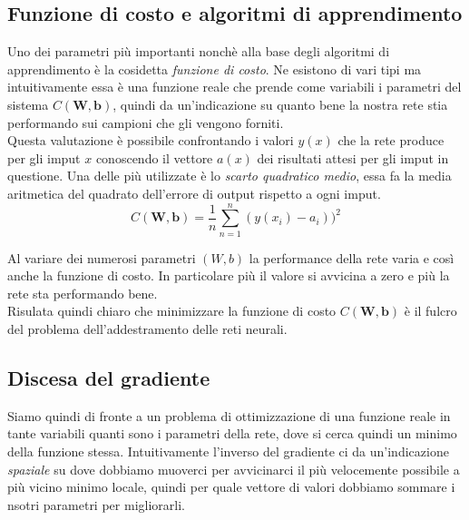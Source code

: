 \documentclass[12pt,a4paper,openright,twoside]{report}
\begin{document}
\newpage
\subsection{Funzione di costo e algoritmi di apprendimento}
Uno dei parametri più importanti nonchè alla base degli algoritmi di apprendimento è la cosidetta \emph{funzione di costo}.
Ne esistono di vari tipi ma intuitivamente essa è una funzione reale che prende come variabili i parametri del sistema $C(\mathbf{W,b})$, quindi da un'indicazione su quanto bene la nostra rete stia performando sui campioni che gli vengono forniti.\\
Questa valutazione è possibile confrontando i valori $y(x)$ che la rete produce per gli imput $x$ conoscendo il vettore $a(x)$ dei risultati attesi per gli imput in questione.
Una delle più utilizzate è lo \emph{scarto quadratico medio}, essa fa la media aritmetica del quadrato dell'errore di output rispetto a ogni imput.
\begin{equation}
    C(\mathbf{W,b}) = \frac{1}{n} \sum_{n=1}^{n} (y(x_{i}) - a_{i}))^2
\end{equation}

Al variare dei numerosi parametri $(W,b)$ la performance della rete varia e così anche la funzione di costo. In particolare più il valore si avvicina a zero e più la rete sta performando bene. \\
Risulata quindi chiaro che minimizzare la funzione di costo $C(\mathbf{W,b})$ è il fulcro del problema dell'addestramento delle reti neurali.
\subsection{Discesa del gradiente}
Siamo quindi di fronte a un problema di ottimizzazione di una funzione reale in tante variabili quanti sono i parametri della rete, dove si cerca quindi un minimo della funzione stessa.
Intuitivamente l'inverso del gradiente ci da un'indicazione \emph{spaziale} su dove dobbiamo muoverci per avvicinarci il più velocemente possibile a più vicino minimo locale, quindi per quale vettore di valori dobbiamo sommare i nsotri parametri per migliorarli. \\
\end{document}
